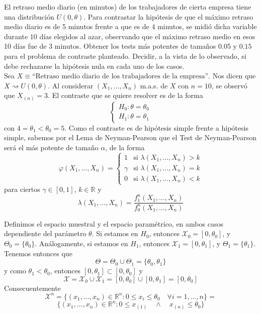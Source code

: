 \documentclass[12pt]{article}
\newcommand{\R}{\mathbb{R}}
\newcommand{\X}{\mathcal{X}}
\begin{document}
\begin{ejercicio}[2 puntos]
\begin{enumerate}[label=\alph*)]
        \end{enumerate}
    \end{ejercicio}

    \newpage

    \begin{ejercicio}[1.75 puntos]
        El retraso medio diario (en minutos) de los trabajadores de cierta empresa tiene una distribución $U(0,\theta)$. 
        Para contrastar la hipótesis de que el máximo retraso medio diario es de 5 minutos frente a que es de 4 minutos, 
        se midió dicha variable durante 10 días elegidos al azar, observando que el máximo retraso medio en esos 10 días 
        fue de 3 minutos. Obtener los tests más potentes de tamaños $0.05$ y $0.15$ para el problema de contraste planteado. 
        Decidir, a la vista de lo observado, si debe rechazarse la hipótesis nula en cada uno de los casos. \\

        Sea $X \equiv \text{``Retraso medio diario de los trabajadores de la empresa''}$.
        Nos dicen que $X \rightsquigarrow U(0,\theta)$. Al considerar $(X_1, \ldots, X_n)$ m.a.s. de $X$ con $n=10$, se observó que $X_{(n)} = 3$. 
        El contraste que se quiere resolver es de la forma
        $$\begin{cases}
            H_0:\theta = \theta_0 \\
            H_1:\theta = \theta_1
        \end{cases}$$
        con $4 = \theta_1 < \theta_0 = 5$. Como el contraste es de hipótesis simple frente a hipótesis simple, sabemos por el Lema de Neyman-Pearson que el 
        Test de Neyman-Pearson será el más potente de tamaño $\alpha$, de la forma
        $$\varphi(X_1, \ldots, X_n) = \begin{cases}
            1 &\text{si } \lambda(X_1, \ldots, X_n) > k \\
            \gamma &\text{si } \lambda(X_1, \ldots, X_n) = k \\
            0 &\text{si } \lambda(X_1, \ldots, X_n) < k
        \end{cases}$$
        para ciertos $\gamma \in [0,1]$, $k \in \R$ y 
        $$\lambda(X_1, \ldots, X_n) = \dfrac{f_1^n(X_1, \ldots, X_n)}{f_0^n(X_1, \ldots, X_n)}$$

        Definimos el espacio muestral y el espacio paramétrico, en ambos casos dependiente del parámetro
        $\theta$. Si estamos en $H_0$, entonces $\X_0 = [0, \theta_0]$, y $\Theta_0 = 
        \{\theta_0\}$. Análogamente, si estamos en $H_1$, entonces $\X_1 = [0, \theta_1]$, y $\Theta_1 = 
        \{\theta_1\}$. Tenemos entonces que $$\Theta = \Theta_0 \cup \Theta_1 = \{\theta_0, \theta_1\}$$ y como
        $\theta_1 < \theta_0$, entonces $[0, \theta_1] \subset [0, \theta_0]$ y
        $$\X = \X_0 \cup \X_1 = [0, \theta_0] \cup [0, \theta_1] = [0, \theta_0]$$
        Consecuentemente $$\X^n = \{(x_1, \ldots, x_n) \in \R^n : 0 \leq x_i \leq \theta_0 \quad \forall i = 1, \ldots, n\} = $$
        $$\{(x_1, \ldots, x_n) \in \R^n : 0 \leq x_{(1)} \quad \land \quad x_{(n)} \leq \theta_0\}$$


\end{ejercicio}
\end{document}
